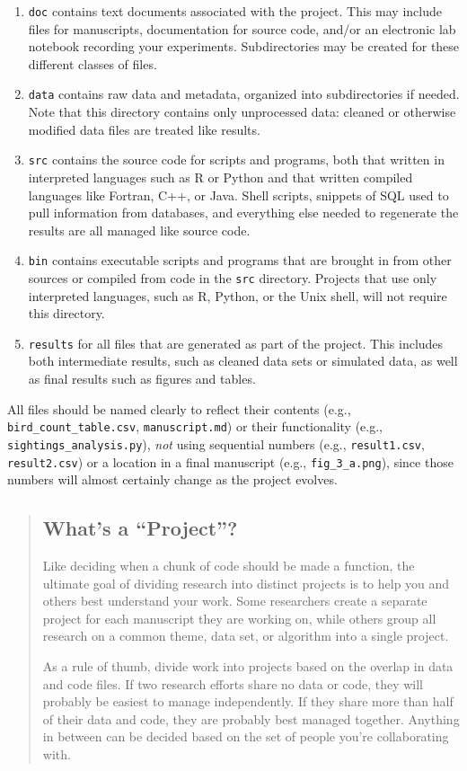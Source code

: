 \documentclass[10pt]{article}
\begin{document}
\begin{enumerate}
\item
  \texttt{doc} contains text documents associated with the project. This
  may include files for manuscripts, documentation for source code,
  and/or an electronic lab notebook recording your experiments.
  Subdirectories may be created for these different classes of files.
\item
  \texttt{data} contains raw data and metadata, organized into
  subdirectories if needed. Note that this directory contains only
  unprocessed data: cleaned or otherwise modified data files are treated
  like results.
\item
  \texttt{src} contains the source code for scripts and programs, both
  that written in interpreted languages such as R or Python and that
  written compiled languages like Fortran, C++, or Java. Shell scripts,
  snippets of SQL used to pull information from databases, and
  everything else needed to regenerate the results are all managed like
  source code.
\item
  \texttt{bin} contains executable scripts and programs that are brought
  in from other sources or compiled from code in the \texttt{src}
  directory. Projects that use only interpreted languages, such as R,
  Python, or the Unix shell, will not require this directory.
\item
  \texttt{results} for all files that are generated as part of the
  project. This includes both intermediate results, such as cleaned data
  sets or simulated data, as well as final results such as figures and
  tables.
\end{enumerate}

All files should be named clearly to reflect their contents (e.g.,
\texttt{bird\_count\_table.csv}, \texttt{manuscript.md}) or their
functionality (e.g., \texttt{sightings\_analysis.py}), \emph{not} using
sequential numbers (e.g., \texttt{result1.csv}, \texttt{result2.csv}) or
a location in a final manuscript (e.g., \texttt{fig\_3\_a.png}), since
those numbers will almost certainly change as the project evolves.

\begin{quote}
\subsection*{What's a ``Project''?}

Like deciding when a chunk of code should be made a function, the
ultimate goal of dividing research into distinct projects is to help you
and others best understand your work. Some researchers create a separate
project for each manuscript they are working on, while others group all
research on a common theme, data set, or algorithm into a single
project.

As a rule of thumb, divide work into projects based on the overlap in
data and code files. If two research efforts share no data or code, they
will probably be easiest to manage independently. If they share more
than half of their data and code, they are probably best managed
together. Anything in between can be decided based on the set of people
you're collaborating with.
\end{quote}
\end{document}
